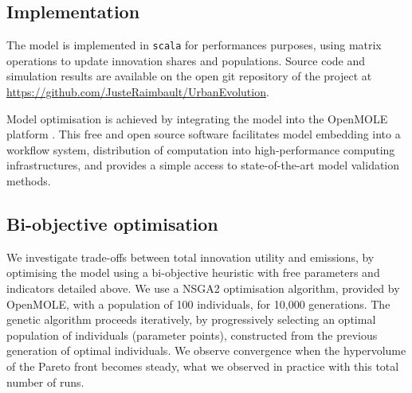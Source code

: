 \documentclass[final,5p,times,twocolumn,authoryear]{elsarticle}
\begin{document}
\subsection{Implementation}

The model is implemented in \texttt{scala} for performances purposes, using matrix operations to update innovation shares and populations. Source code and simulation results are available on the open git repository of the project at \url{https://github.com/JusteRaimbault/UrbanEvolution}.

Model optimisation is achieved by integrating the model into the OpenMOLE platform \cite{reuillon2013openmole}. This free and open source software facilitates model embedding into a workflow system, distribution of computation into high-performance computing infrastructures, and provides a simple access to state-of-the-art model validation methods.


\subsection{Bi-objective optimisation}

We investigate trade-offs between total innovation utility and emissions, by optimising the model using a bi-objective heuristic with free parameters and indicators detailed above. We use a NSGA2 optimisation algorithm, provided by OpenMOLE, with a population of 100 individuals, for 10,000 generations. The genetic algorithm proceeds iteratively, by progressively selecting an optimal population of individuals (parameter points), constructed from the previous generation of optimal individuals. We observe convergence when the hypervolume of the Pareto front becomes steady, what we observed in practice with this total number of runs.
\end{document}
